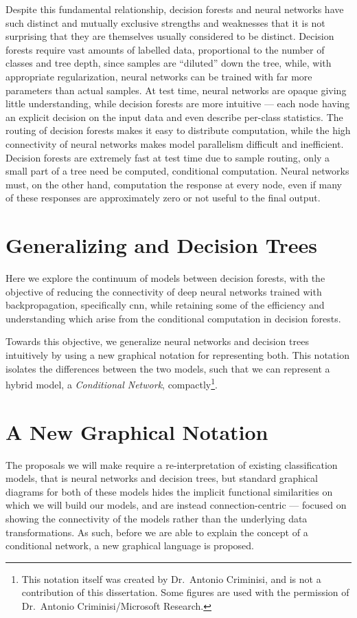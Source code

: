 \documentclass[thesis]{subfiles}
\begin{document}
	Despite this fundamental relationship, decision forests and neural networks have such distinct and mutually exclusive strengths and weaknesses that it is not surprising that they are themselves usually considered to be distinct. Decision forests require vast amounts of labelled data, proportional to the number of classes and tree depth, since samples are ``diluted'' down the tree, while, with appropriate regularization, neural networks can be trained with far more parameters than actual samples. At test time, neural networks are opaque giving little understanding, while decision forests are more intuitive --- each node having an explicit decision on the input data and even describe per-class statistics. The routing of decision forests makes it easy to distribute computation, while the high connectivity of neural networks makes model parallelism difficult and inefficient. Decision forests are extremely fast at test time due to sample routing, only a small part of a tree need be computed, \ie conditional computation. Neural networks must, on the other hand, computation the response at every node, even if many of these responses are approximately zero or not useful to the final output.
	
	\section{Generalizing  and Decision Trees}
	Here we explore the continuum of models between decision forests, with the objective of reducing the connectivity of deep neural networks trained with backpropagation, specifically \gls{cnn}, while retaining some of the efficiency and understanding which arise from the conditional computation in decision forests.
	
	Towards this objective, we generalize neural networks and decision trees intuitively by using a new graphical notation for representing both. This notation isolates the differences between the two models, such that we can represent a hybrid model, \ie a \emph{Conditional Network}, compactly\footnote{This notation itself was created by Dr.\ Antonio Criminisi, and is not a contribution of this dissertation. Some figures are used with the permission of Dr.\ Antonio Criminisi/Microsoft Research.}.
	
	\section{A New Graphical Notation}
	The proposals we will make require a re-interpretation of existing classification models, that is neural networks and decision trees, but standard graphical diagrams for both of these models hides the implicit functional similarities on which we will build our models, and are instead connection-centric --- focused on showing the connectivity of the models rather than the underlying data transformations. As such, before we are able to explain the concept of a conditional network, a new graphical language is proposed.
	
\end{document}

